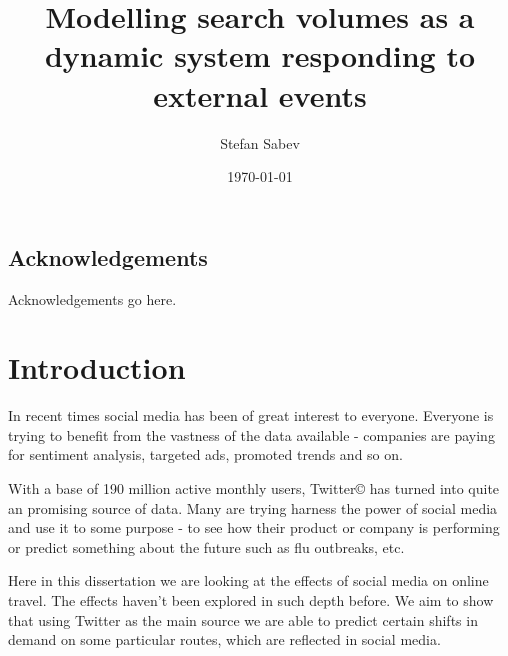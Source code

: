 \documentclass[bsc,frontabs,twoside,singlespacing,parskip]{infthesis}
\begin{document}
\title{Modelling search volumes as a dynamic system responding to external events}

\author{Stefan Sabev}


\date{\today}


\maketitle

\section*{Acknowledgements}
Acknowledgements go here. 

\tableofcontents



\chapter{Introduction}

In recent times social media has been of great interest to everyone. Everyone is trying to benefit from the vastness of the data available - companies are paying for sentiment analysis, targeted ads, promoted trends and so on. 

With a base of 190 million active monthly users, Twitter{\copyright}  has turned into quite an promising source of data. Many are trying harness the power of social media and use it to some purpose - to see how their product or company is performing or predict something about the future such as flu outbreaks, etc.

Here in this dissertation we are looking at the effects of social media on online travel. The effects haven't been explored in such depth before. We aim to show that using Twitter as the main source we are able to predict certain shifts in demand on some particular routes, which are reflected in social media. 
\end{document}
